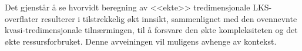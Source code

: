 Det gjenstår å se hvorvidt beregning av <<ekte>> tredimensjonale LKS-overflater
resulterer i tilstrekkelig økt innsikt, sammenlignet med den ovennevnte
kvasi-tredimensjonale tilnærmingen, til å forsvare den økte kompleksiteten og
det økte ressursforbruket. Denne avveiningen vil muligens
avhenge av kontekst.
\endgroup
